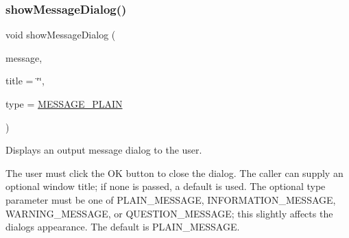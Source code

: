 \subsubsection{\texorpdfstring{show\+Message\+Dialog()}{showMessageDialog()}\hspace{0.1cm}{\footnotesize\ttfamily [1/3]}}
{\footnotesize\ttfamily void show\+Message\+Dialog (\begin{DoxyParamCaption}\item[{const std\+::string \&}]{message,  }\item[{const std\+::string \&}]{title = {\ttfamily \char`\"{}\char`\"{}},  }\item[{\mbox{\hyperlink{classsgl_1_1GOptionPane_ac6606ebe91c8ac66a2c314c79f5ab013}{Message\+Type}}}]{type = {\ttfamily \mbox{\hyperlink{classsgl_1_1GOptionPane_ac6606ebe91c8ac66a2c314c79f5ab013ac03a17c74c589b004d166532958a6196}{M\+E\+S\+S\+A\+G\+E\+\_\+\+P\+L\+A\+IN}}} }\end{DoxyParamCaption})\hspace{0.3cm}{\ttfamily [static]}}



Displays an output message dialog to the user. 

The user must click the \textquotesingle{}OK\textquotesingle{} button to close the dialog. The caller can supply an optional window title; if none is passed, a default is used. The optional \textquotesingle{}type\textquotesingle{} parameter must be one of P\+L\+A\+I\+N\+\_\+\+M\+E\+S\+S\+A\+GE, I\+N\+F\+O\+R\+M\+A\+T\+I\+O\+N\+\_\+\+M\+E\+S\+S\+A\+GE, W\+A\+R\+N\+I\+N\+G\+\_\+\+M\+E\+S\+S\+A\+GE, or Q\+U\+E\+S\+T\+I\+O\+N\+\_\+\+M\+E\+S\+S\+A\+GE; this slightly affects the dialog\textquotesingle{}s appearance. The default is P\+L\+A\+I\+N\+\_\+\+M\+E\+S\+S\+A\+GE. \mbox{\label{classsgl_1_1GOptionPane_ac3ad66eb6ee62ad9140d04e38440e782}} 
